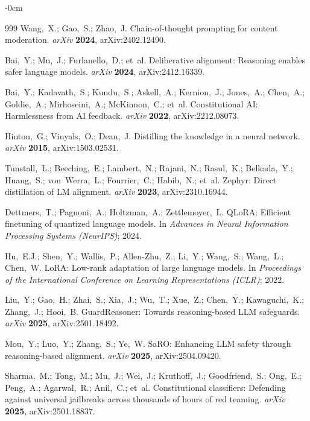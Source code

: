 \documentclass[Superintelligence,article,submit,pdftex,moreauthors]{Definitions/mdpi}
\begin{document}
\begin{adjustwidth}{-\extralength}{0cm}
{\begin{thebibliography}{999}
Wang,~X.; Gao,~S.; Zhao,~J.
Chain-of-thought prompting for content moderation.
{\em arXiv} {\bf 2024}, arXiv:2402.12490.

Bai,~Y.; Mu,~J.; Furlanello,~D.; et~al.
Deliberative alignment: Reasoning enables safer language models.
{\em arXiv} {\bf 2024}, arXiv:2412.16339.

Bai,~Y.; Kadavath,~S.; Kundu,~S.; Askell,~A.; Kernion,~J.; Jones,~A.; Chen,~A.; Goldie,~A.; Mirhoseini,~A.; McKinnon,~C.; et~al.
Constitutional {AI}: Harmlessness from {AI} feedback.
{\em arXiv} {\bf 2022}, arXiv:2212.08073.

Hinton,~G.; Vinyals,~O.; Dean,~J.
Distilling the knowledge in a neural network.
{\em arXiv} {\bf 2015}, arXiv:1503.02531.

Tunstall,~L.; Beeching,~E.; Lambert,~N.; Rajani,~N.; Rasul,~K.; Belkada,~Y.; Huang,~S.; von~Werra,~L.; Fourrier,~C.; Habib,~N.; et~al.
Zephyr: Direct distillation of {LM} alignment.
{\em arXiv} {\bf 2023}, arXiv:2310.16944.

Dettmers,~T.; Pagnoni,~A.; Holtzman,~A.; Zettlemoyer,~L.
{QLoRA}: Efficient finetuning of quantized language models.
In {\em Advances in Neural Information Processing Systems (NeurIPS)}; 2024.

Hu,~E.J.; Shen,~Y.; Wallis,~P.; Allen-Zhu,~Z.; Li,~Y.; Wang,~S.; Wang,~L.; Chen,~W.
{LoRA}: Low-rank adaptation of large language models.
In {\em Proceedings of the International Conference on Learning Representations (ICLR)}; 2022.

Liu,~Y.; Gao,~H.; Zhai,~S.; Xia,~J.; Wu,~T.; Xue,~Z.; Chen,~Y.; Kawaguchi,~K.; Zhang,~J.; Hooi,~B.
{GuardReasoner}: Towards reasoning-based {LLM} safeguards.
{\em arXiv} {\bf 2025}, arXiv:2501.18492.

Mou,~Y.; Luo,~Y.; Zhang,~S.; Ye,~W.
{SaRO}: Enhancing {LLM} safety through reasoning-based alignment.
{\em arXiv} {\bf 2025}, arXiv:2504.09420.

Sharma,~M.; Tong,~M.; Mu,~J.; Wei,~J.; Kruthoff,~J.; Goodfriend,~S.; Ong,~E.; Peng,~A.; Agarwal,~R.; Anil,~C.; et~al.
Constitutional classifiers: Defending against universal jailbreaks across thousands of hours of red teaming.
{\em arXiv} {\bf 2025}, arXiv:2501.18837.


\end{thebibliography}}
\end{adjustwidth}
\end{document}

